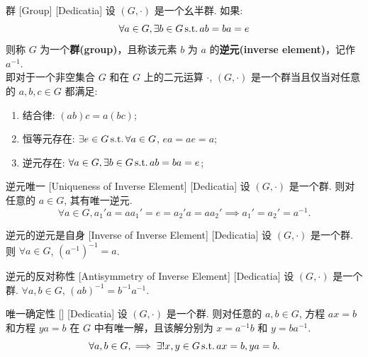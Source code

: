        \begin{dfn}
            [Group]
            {群}
            [Group]
            [Dedicatia]
            设 \((G,\cdot)\) 是一个幺半群. 如果: 
            \[\forall a\in G,\exists b\in G \operatorname{\text{s.t.}} ab=ba=e\]
            则称 \(G\) 为一个\textbf{群(group)}，且称该元素 \(b\) 为 \(a\) 的\textbf{逆元(inverse element)}，记作 \(a^{-1}\).\\
            即对于一个非空集合 \(G\) 和在 \(G\) 上的二元运算 \(\cdot\), \((G,\cdot)\) 是一个群当且仅当对任意的 \(a,b,c\in G\) 都满足:
            \begin{enumerate}
                \item 结合律: \((ab)c=a(bc)\);
                \item 恒等元存在: \(\exists e\in G\operatorname{\text{s.t.}}\forall a\in G\), \(ea=ae=a\);
                \item 逆元存在: \(\forall a\in G,\exists b\in G \operatorname{\text{s.t.}} ab=ba=e\);
            \end{enumerate}
        \end{dfn}

        \begin{ppt}
            {逆元唯一}
            [Uniqueness of Inverse Element]
            [Dedicatia]
            设 \((G,\cdot)\) 是一个群. 则对任意的 \(a\in G\), 其有唯一逆元.
            \[\forall a\in G, a_1'a=aa_1'=e=a_2'a=aa_2'\implies a_1'=a_2'=a^{-1}.\]  
        \end{ppt}

        \begin{ppt}
            {逆元的逆元是自身}
            [Inverse of Inverse Element]
            [Dedicatia]
            设 \((G,\cdot)\) 是一个群. 则 \(\forall a\in G\), \((a^{-1})^{-1}=a\).
        \end{ppt}

        \begin{ppt}
            {逆元的反对称性}
            [Antisymmetry of Inverse Element]
            [Dedicatia]
            设 \((G,\cdot)\) 是一个群. \(\forall a,b\in G\), \((ab)^{-1}=b^{-1}a^{-1}\).
        \end{ppt}

        \begin{ppt}
            {唯一确定性}
            []
            [Dedicatia]
            设 \((G,\cdot)\) 是一个群. 则对任意的 \(a,b\in G\), 方程 \(ax=b\) 和方程 \(ya=b\) 在 \(G\) 中有唯一解，且该解分别为 \(x=a^{-1}b\) 和 \(y=ba^{-1}\).
            \[\forall a,b\in G,\implies\exists!x,y\in G\operatorname{\text{s.t.}} ax=b,ya=b.\]
        \end{ppt}

